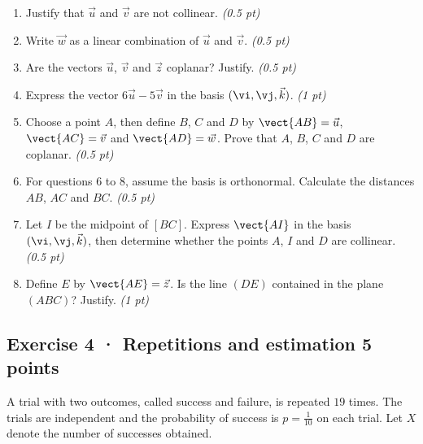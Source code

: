 \begin{enumerate}

\item Justify that $\vec u$ and $\vec v$ are not collinear. \hfill\textit{(0.5 pt)}

\item Write $\vec w$ as a linear combination of $\vec u$ and $\vec v$. \hfill\textit{(0.5 pt)}

\item Are the vectors $\vec u$, $\vec v$ and $\vec z$ coplanar? Justify. \hfill\textit{(0.5 pt)}

\item Express the vector $6\vec u-5\vec v$ in the basis $(\vi,\vj,\vec k)$. \hfill\textit{(1 pt)}

\item Choose a point $A$, then define $B$, $C$ and $D$ by $\vect{AB}=\vec u$, $\vect{AC}=\vec v$ and $\vect{AD}=\vec w$. Prove that $A$, $B$, $C$ and $D$ are coplanar. \hfill\textit{(0.5 pt)}

\item For questions 6 to 8, assume the basis is orthonormal. Calculate the distances $AB$, $AC$ and $BC$. \hfill\textit{(0.5 pt)}

\item Let $I$ be the midpoint of $[BC]$. Express $\vect{AI}$ in the basis $(\vi,\vj,\vec k)$, then determine whether the points $A$, $I$ and $D$ are collinear. \hfill\textit{(0.5 pt)}

\item Define $E$ by $\vect{AE}=\vec z$. Is the line $(DE)$ contained in the plane $(ABC)$? Justify. \hfill\textit{(1 pt)}

\end{enumerate}

\subsection*{Exercise 4 · Repetitions and estimation \hfill 5 points}A trial with two outcomes, called success and failure, is repeated $19$ times. The trials are independent and the probability of success is $p=\frac{1}{10}$ on each trial. Let $X$ denote the number of successes obtained.

